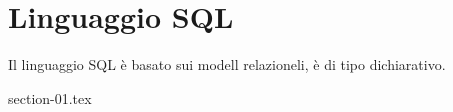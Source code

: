 \chapter{Linguaggio SQL}%
\label{cha:Linguaggio SQL}

Il linguaggio SQL è basato sui modell relazioneli, è di tipo dichiarativo.

{section-01.tex}

